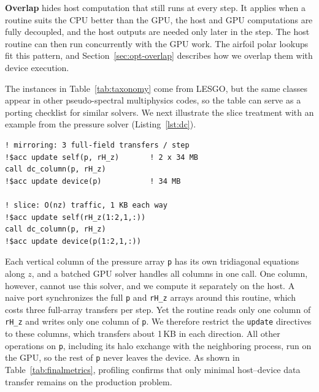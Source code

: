 \vspace{0.08in}
\noindent\textbf{Overlap} hides host computation that still runs at every
step. It applies when a routine suits the CPU better than the GPU, the
host and GPU computations are fully decoupled, and the host outputs are
needed only later in the step. The host
routine can then run concurrently with the GPU work. The airfoil polar
lookups fit this pattern, and Section~\ref{sec:opt-overlap} describes
how we overlap them with device execution.


The instances in Table~\ref{tab:taxonomy} come from LESGO, but the
same classes appear in other pseudo-spectral multiphysics
codes, so the table can serve as a porting checklist for similar solvers.
We next illustrate the slice treatment with an example from the
pressure solver (Listing~\ref{lst:dc}).

\begin{lstlisting}[float=h,linewidth=\columnwidth,
caption={Structure-aware partial transfer in the
pressure solver. A 1D column transfer (bottom) replaces full 3D array
transfers (top).},label={lst:dc}]
! mirroring: 3 full-field transfers / step
!$acc update self(p, rH_z)       ! 2 x 34 MB
call dc_column(p, rH_z)
!$acc update device(p)           ! 34 MB

! slice: O(nz) traffic, 1 KB each way
!$acc update self(rH_z(1:2,1,:))
call dc_column(p, rH_z)
!$acc update device(p(1:2,1,:))
\end{lstlisting}

Each vertical column of the pressure array \texttt{p} has its own
tridiagonal equations along $z$, and a batched GPU solver handles all
columns in one call. One column, however, cannot use this
solver, and we
compute it separately on the host.
A naive port synchronizes the full
\texttt{p} and \texttt{rH\_z} arrays around this routine, which costs three
full-array transfers per step. Yet the routine reads only one column of
\texttt{rH\_z} and writes only one column of \texttt{p}. We therefore
restrict the \texttt{update} directives to these columns, which
transfers about 1\,KB in each direction. All other operations on \texttt{p}, including its halo
exchange with the neighboring process, run on the GPU, so the rest of
\texttt{p} never leaves the device. As shown in
Table~\ref{tab:finalmetrics}, profiling confirms that only minimal
host--device data transfer remains on the production problem. 
